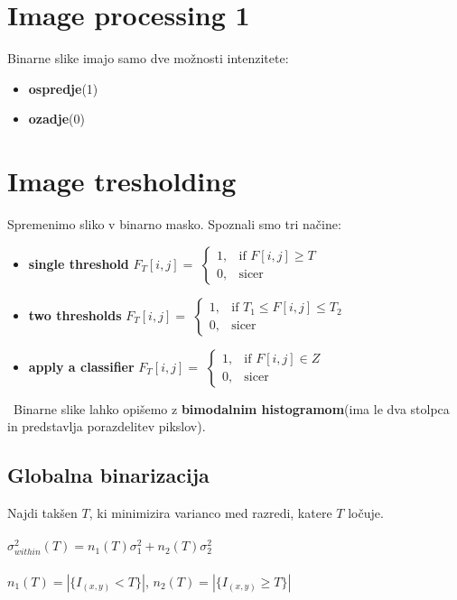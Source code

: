 \documentclass[11pt]{article}
\begin{document}
\newpage

\section{Image processing 1}
Binarne slike imajo samo dve mo\v{z}nosti intenzitete:
\begin{itemize}
\item \textbf{ospredje}(1)
\item \textbf{ozadje}(0)
\end{itemize}

\section{Image tresholding}
Spremenimo sliko v binarno masko. Spoznali smo tri na\v{c}ine:
\begin{itemize}
\item \textbf{single threshold} $F_T[i, j] = $
$
\begin{cases}
	1, & \text{if } F[i, j] \geq T \\
	0, & \text{sicer}
\end{cases}
$
\item \textbf{two thresholds} $F_T[i, j] = $
$
\begin{cases}
	1, & \text{if } T_1 \leq F[i, j] \leq T_2 \\
	0, & \text{sicer}
\end{cases}
$
\item \textbf{apply a classifier} $F_T[i, j] = $
$
\begin{cases}
	1, & \text{if } F[i, j] \in Z \\
	0, & \text{sicer}
\end{cases}
$
\end{itemize}
\
Binarne slike lahko opi\v{s}emo z \textbf{bimodalnim histogramom}(ima le dva stolpca in predstavlja porazdelitev pikslov).

\subsection{Globalna binarizacija}
Najdi tak\v{s}en $T$, ki minimizira varianco med razredi, katere $T$ lo\v{c}uje. \\
\\
$\sigma^2_{within}(T) = n_1(T)\sigma^2_1 + n_2(T)\sigma^2_2$ \\
\\
$n_1(T) = |\{I_{(x, y)} < T\}|$, $n_2(T) = |\{I_{(x, y)} \geq T\}|$
\end{document}
